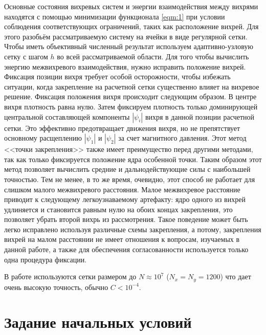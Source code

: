 Основные состояния вихревых систем и энергии взаимодействия между вихрями 
находятся с помощью минимизации функционала \eqref{eqm:1} при условии 
соблюдения соответствующих ограничений, таких как расположение вихрей. Для 
этого разобьём рассматриваемую систему на ячейки в виде регулярной сетки. 
Чтобы иметь объективный численный результат используем адаптивно-узловую сетку 
с шагом \( h \) во всей рассматриваемой области. Для того чтобы вычислить 
энергию межвихревого взаимодействия, нужно исправить положение вихрей. 
Фиксация позиции вихря требует особой осторожности, чтобы избежать ситуации, 
когда закрепление на расчетной сетки существенно влияет на вихревое решение. 
Фиксация положения вихря происходит следующим образом. В центре вихря 
плотность равна нулю. Затем фиксируем плотность только доминирующей 
центральной составляющей компоненты \( |\psi_i| \) вихря в данной позиции 
расчетной сетки. Это эффективно предотвращает движения вихря, но не 
препятствует основному расщеплению \( |\psi_1| \) и \( |\psi_2| \) за счет 
магнитного давления. Этот метод <<точки закрепления>> также имеет преимущество 
перед другими методами, так как только фиксируется положение ядра особенной 
точки. Таким образом этот метод позволяет вычислить средние и 
дальнодействующие силы с наибольшей точностью. Тем не менее, в то же время, 
очевидно, этот способ не работает для слишком малого межвихревого расстояния. 
Малое межвихревое расстояние приводит к следующему легкоузнаваемому артефакту: 
ядро одного из вихрей удлиняется и становится равным нулю на обоих концах 
закрепления, это позволяет убрать второй вихрь из рассмотрения. Такое 
поведение может быть легко исправлено используя различные схемы закрепления, а 
потому, закрепления вихрей на малом расстоянии не имеет отношения к вопросам, 
изучаемых в данной работе, а также для обеспечения согласованности 
используется только одна процедура фиксации.

В работе используются сетки размером до \( N \approx 10^7 \) 
(\( N_x = N_y = 1200 \)) что дает очень высокую точность, обычно 
\( C < 10^{-4} \). \cite{bib:minimization}

\section{Задание начальных условий}

